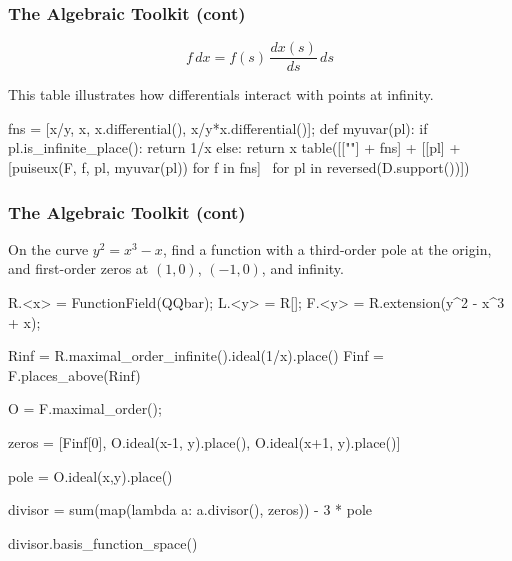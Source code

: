 \documentclass[aspectratio=169,dvipsnames]{beamer}
\begin{document}
\begin{frame}[fragile]
\frametitle{The Algebraic Toolkit (cont)}

\[ f\, dx = f(s) \, \frac{dx(s)}{ds} \, ds \]

This table illustrates how differentials interact with points at infinity.

\begin{sageblock}[ex1]
fns = [x/y, x, x.differential(), x/y*x.differential()];
def myuvar(pl):
    if pl.is_infinite_place():
        return 1/x
    else:
        return x
table([[""] + fns] + [[pl] + [puiseux(F, f, pl, myuvar(pl)) for f in fns] \
                      for pl in reversed(D.support())])
\end{sageblock}

\end{frame}

\begin{frame}[fragile]
\frametitle{The Algebraic Toolkit (cont)}

On the curve $y^2 = x^3 - x$, find a function with a third-order pole at the origin, and first-order zeros at $(1,0)$, $(-1,0)$, and infinity.

\begin{sageblock}[ex1]
R.<x> = FunctionField(QQbar); L.<y> = R[]; F.<y> = R.extension(y^2 - x^3 + x);

Rinf = R.maximal_order_infinite().ideal(1/x).place()
Finf = F.places_above(Rinf)

O = F.maximal_order();

zeros = [Finf[0], O.ideal(x-1, y).place(), O.ideal(x+1, y).place()]

pole = O.ideal(x,y).place()

divisor = sum(map(lambda a: a.divisor(), zeros)) - 3 * pole

divisor.basis_function_space()

\end{sageblock}

\end{frame}

\end{document}
